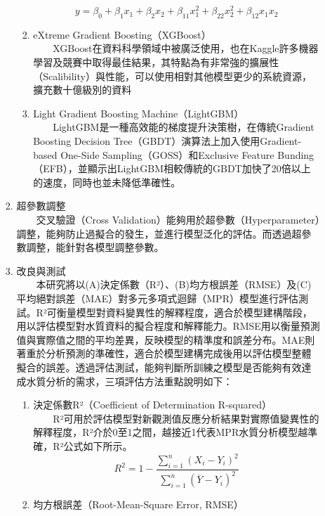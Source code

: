 \documentclass[12pt,a4paper]{article}
\begin{document}
\begin{enumerate}
\begin{enumerate}[label=\arabic*.]
\begin{enumerate}[label=2-2-\arabic*.]
\begin{enumerate}[label=\Alph*.]
\begin{equation}
                        y = \beta_0 + \beta_1 x_1 + \beta_2 x_2 + \beta_{11} x_1^2 + \beta_{22} x_2^2 + \beta_{12} x_1 x_2       \end{equation} 
                \item eXtreme Gradient Boosting（XGBoost）\\
                　　XGBoost在資料科學領域中被廣泛使用，也在Kaggle許多機器學習及競賽中取得最佳結果，其特點為有非常強的擴展性（Scalibility）與性能，可以使用相對其他模型更少的系統資源，擴充數十億級別的資料\cite{ref9}
                \item Light Gradient Boosting Machine（LightGBM）\\
                　　LightGBM是一種高效能的梯度提升決策樹，在傳統Gradient Boosting Decision Tree（GBDT）演算法上加入使用Gradient-based One-Side Sampling（GOSS）和Exclusive Feature Bunding （EFB），並顯示出LightGBM相較傳統的GBDT加快了20倍以上的速度，同時也並未降低準確性\cite{ref10}。
            \end{enumerate}
        \item 超參數調整\\
        　　交叉驗證（Cross Validation）能夠用於超參數（Hyperparameter）調整，能夠防止過擬合的發生，並進行模型泛化的評估\cite{ref34}。而透過超參數調整，能針對各模型調整參數。
        \item 改良與測試\\
        　　本研究將以(A)決定係數（R²）、(B)均方根誤差（RMSE）及(C)平均絕對誤差（MAE）對多元多項式迴歸（MPR）模型進行評估測試。R²可衡量模型對資料變異性的解釋程度，適合於模型建構階段，用以評估模型對水質資料的擬合程度和解釋能力。RMSE用以衡量預測值與實際值之間的平均差異，反映模型的精準度和誤差分布。MAE則著重於分析預測的準確性，適合於模型建構完成後用以評估模型整體擬合的誤差。透過評估測試，能夠判斷所訓練之模型是否能夠有效達成水質分析的需求，三項評估方法重點說明如下：
            \begin{enumerate}[label=\Alph*.]
                \item 決定係數R²（Coefficient of Determination R-squared）\\
                　　R²可用於評估模型對新觀測值反應分析結果對實際值變異性的解釋程度，R²介於0至1之間，越接近1代表MPR水質分析模型越準確，R²公式如下所示。
                    \begin{equation}
                    R^2 = 1 - \frac{\sum_{i=1}^n (X_i - Y_i)^2}{\sum_{i=1}^n (\overline{Y} - Y_i)^2}
                    \end{equation}
                \item 均方根誤差（Root-Mean-Square Error, RMSE）\\

\end{enumerate}
\end{enumerate}
\end{enumerate}
\end{enumerate}
\end{document}
